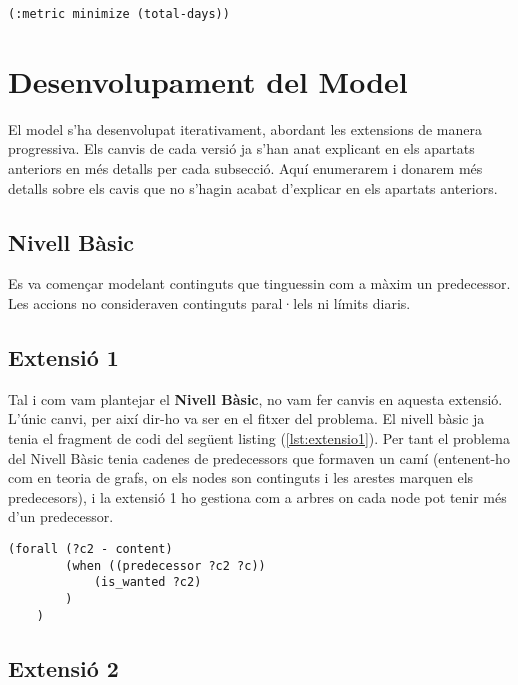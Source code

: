 \documentclass[a4paper]{article}
\begin{document}
	\begin{lstlisting}[language=PDDL, caption={Exemple de \textit{mètrica} del problema}, label={lst:metric_problema}]
	(:metric minimize (total-days))
	\end{lstlisting}
	
	\newpage
	\section{Desenvolupament del Model}
	
	El model s'ha desenvolupat iterativament, abordant les extensions de manera progressiva. Els canvis de cada versió ja s'han anat explicant en els apartats anteriors en més detalls per cada subsecció. Aquí enumerarem i donarem més detalls sobre els cavis que no s'hagin acabat d'explicar en els apartats anteriors.
	
	\subsection{Nivell Bàsic}
	
	Es va començar modelant continguts que tinguessin com a màxim un predecessor. Les accions no consideraven continguts paral·lels ni límits diaris.
	
	\subsection{Extensió 1}
	
	Tal i com vam plantejar el \textbf{Nivell Bàsic}, no vam fer canvis en aquesta extensió. L'únic canvi, per així dir-ho va ser en el fitxer del problema. El nivell bàsic ja tenia el fragment de codi del següent listing (\ref{lst:extensio1}). Per tant el problema del Nivell Bàsic tenia cadenes de predecessors que formaven un camí (entenent-ho com en teoria de grafs, on els nodes son continguts i les arestes marquen els predecesors), i la extensió 1 ho gestiona com a arbres on cada node pot tenir més d'un predecessor. \\
	
	\begin{lstlisting}[language=PDDL, caption={Fragment per assignar més d'un predecessor com a pendent de veure}, label={lst:extensio1}]
	(forall (?c2 - content)
		(when ((predecessor ?c2 ?c))
			(is_wanted ?c2)
		)
	)
	\end{lstlisting}
	
	\subsection{Extensió 2}
	
\end{document}
